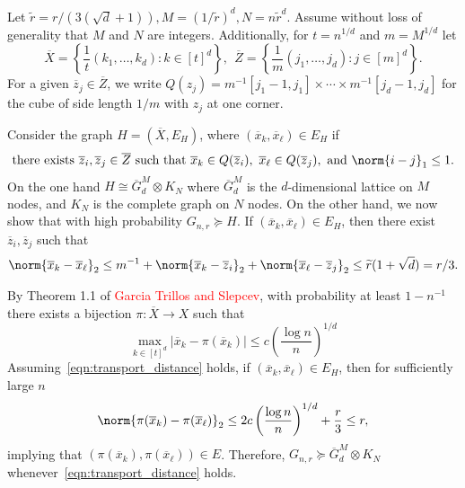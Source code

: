 \documentclass{article}
\newcommand{\abs}[1]{\left \lvert #1 \right \rvert}
\newcommand{\set}[1]{\left\{#1\right\}}
\newcommand{\1}{\mathbf{1}}
\newcommand{\wt}[1]{\widetilde{#1}}
\newcommand{\ol}[1]{\overline{#1}}
\theoremstyle{alden}
\theoremstyle{aldenthm}
\theoremstyle{definition}
\theoremstyle{remark}
\begin{document}
Let $\wt{r} = r/(3(\sqrt{d} + 1)), M = (1/\wt{r})^d, N = n\wt{r}^d$. Assume without loss of generality that $M$ and $N$ are integers. Additionally, for $t = n^{1/d}$ and $m = M^{1/d}$ let 
\begin{equation*}
\overline{X} = \set{\frac{1}{t}(k_1,\ldots,k_d): k \in [t]^d},~~ \overline{Z} = \set{\frac{1}{m}(j_1,\ldots,j_d): j \in [m]^d}.
\end{equation*}
For a given $\overline{z}_j \in \overline{Z}$, we write $Q(z_j) = m^{-1}[j_1 - 1,j_1] \times \cdots \times m^{-1}[j_d - 1,j_d]$ for the cube of side length $1/m$ with $z_j$ at one corner. 

Consider the graph $H = (\overline{X}, E_H)$, where $(\ol{x}_k, \ol{x}_{\ell}) \in E_H$ if
\begin{equation*}
\textrm{there exists}~\ol{z}_i, \ol{z}_j \in \ol{Z}~\textrm{such that}~\ol{x}_k \in Q(\ol{z}_i),~ \ol{x}_\ell \in Q(\ol{z}_j),~\textrm{and}~\norm{i - j}_1 \leq 1.
\end{equation*}
On the one hand $H \cong \ol{G}^M_d \otimes K_N$ where $\ol{G}^M_d$ is the $d$-dimensional lattice on $M$ nodes, and $K_N$ is the complete graph on $N$ nodes. On the other hand, we now show that with high probability $G_{n,r} \succeq H$. If $(\ol{x}_k, \ol{x}_{\ell}) \in E_H$, then there exist $\ol{z}_i, \ol{z}_j$ such that
\begin{equation*}
\norm{\ol{x}_k - \ol{x}_{\ell}}_2 \leq m^{-1} + \norm{\ol{x}_k - \ol{z}_{i}}_2 + \norm{\ol{x}_{\ell} - \ol{z}_{j}}_2 \leq \wt{r}(1 + \sqrt{d}) = r/3.
\end{equation*}

By Theorem 1.1 of \textcolor{red}{Garcia Trillos and Slepcev}, with probability at least $1 - n^{-1}$ there exists a bijection $\pi: \overline{X} \to X$ such that
\begin{equation}
\label{eqn:transport_distance}
\max_{k \in [t]^d} \abs{\overline{x}_k - \pi(\overline{x}_k)} \leq c \left(\frac{\log n}{n}\right)^{1/d}
\end{equation}
Assuming~\eqref{eqn:transport_distance} holds, if $(\ol{x}_k, \ol{x}_{\ell}) \in E_H$, then for sufficiently large $n$
\begin{equation*}
\norm{\pi(\ol{x}_k) - \pi(\ol{x}_\ell)}_2 \leq 2 c \left(\frac{\log n}{n}\right)^{1/d} + \frac{r}{3} \leq r,
\end{equation*}
implying that $(\pi(\ol{x}_k), \pi(\ol{x}_{\ell})) \in E$. Therefore, $G_{n,r} \succeq \ol{G}^M_d \otimes K_N$ whenever~\eqref{eqn:transport_distance} holds.
\end{document}
